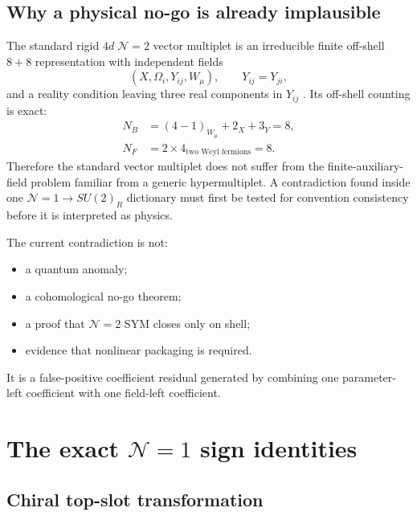 \documentclass[11pt,a4paper,UTF8]{ctexart}
\numberwithin{equation}{section}
\newcommand{\N}{\mathcal N}
\begin{document}
\subsection{Why a physical no-go is already implausible}

The standard rigid $4d\;\N=2$ vector multiplet is an irreducible finite off-shell $8+8$ representation with independent fields
\[
(X,\Omega_i,Y_{ij},W_\mu),
\qquad
Y_{ij}=Y_{ji},
\]
and a reality condition leaving three real components in $Y_{ij}$ \cite{VanProeyen1995}. Its off-shell counting is exact:
\begin{align}
N_B&=(4-1)_{W_\mu}+2_X+3_Y=8,
\\
N_F&=2\times4_{\text{two Weyl fermions}}=8.
\end{align}
Therefore the standard vector multiplet does not suffer from the finite-auxiliary-field problem familiar from a generic hypermultiplet. A contradiction found inside one $\N=1\to SU(2)_R$ dictionary must first be tested for convention consistency before it is interpreted as physics.

\begin{resultbox}
The current contradiction is not:
\begin{itemize}
\item a quantum anomaly;
\item a cohomological no-go theorem;
\item a proof that $\N=2$ SYM closes only on shell;
\item evidence that nonlinear packaging is required.
\end{itemize}
It is a false-positive coefficient residual generated by combining one parameter-left coefficient with one field-left coefficient.
\end{resultbox}

\section{The exact $\N=1$ sign identities}

\subsection{Chiral top-slot transformation}
\end{document}
